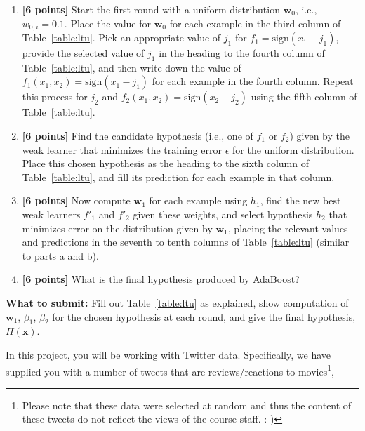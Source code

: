 \documentclass[11pt]{article}
\begin{document}
  \begin{enumerate}
  \item {\bf [6 points]}  Start the first round with a uniform distribution $\textbf{w}_0$, i.e., $w_{0,i} = 0.1$.  Place the value for
    $\textbf{w}_0$ for each example in the third column of Table~\ref{table:ltu}.
Pick an appropriate value of $j_1$ for $f_1 = \text{sign}(x_1 - j_1)$, provide the selected value of $j_1$ in the heading to the fourth column of Table~\ref{table:ltu}, and then write down the value of $f_1(x_1, x_2) = \text{sign}(x_1 - j_1)$ for each example in the fourth column. Repeat this process for $j_2$ and $f_2(x_1, x_2) = \text{sign}(x_2 - j_2)$ using the fifth column of Table~\ref{table:ltu}.
\vspace{3cm}

  \item {\bf [6 points]}
    Find the candidate hypothesis (i.e., one of $f_1$ or $f_2$) given by the weak learner that minimizes the training error
    $\epsilon$ for the uniform distribution.  Place this chosen hypothesis as the heading to the
    sixth column of Table~\ref{table:ltu}, and fill its prediction for each example in that column.
    \vspace{3cm}

   \item {\bf [6 points]} Now compute $\textbf{w}_1$ for each example using $h_1$, find the new best weak learners $f'_1$ and $f'_2$ given these weights, and select hypothesis $h_2$ that
    minimizes error on the distribution given by $\textbf{w}_1$, placing the relevant values and
    predictions in the seventh to tenth columns of Table~\ref{table:ltu} (similar to parts a and b).
    \vspace{6cm}

  \item {\bf [6 points]} What is the final hypothesis produced by AdaBoost?
  \vspace{3cm}

\end{enumerate}

\textbf{What to submit:} Fill out Table~\ref{table:ltu} as explained, show computation of  $\textbf{w}_1$, $\beta_1$, $\beta_2$ for the chosen hypothesis at each round, and give the final hypothesis, $H(\textbf{x})$.

\newpage
{}\label{sec:intro}

In this project, you will be working with Twitter data. Specifically, we have supplied you with a number of tweets that are reviews/reactions to movies\footnote{Please note that these data were selected at random and thus the content of these tweets do not reflect the views of the course staff. :-)},
\end{document}
